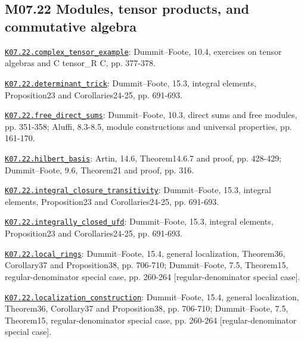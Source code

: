 \subsection*{M07.22 Modules, tensor products, and commutative algebra}
\par\smallskip\noindent\hypertarget{src:K07.22.complex_tensor_example}{}\label{src:K07.22.complex_tensor_example}\hyperref[K07.22.complex_tensor_example]{\texttt{K07.22.complex\_tensor\_example}}: Dummit--Foote, 10.4, exercises on tensor algebras and C tensor\_R C, pp. 377-378.
\par\smallskip\noindent\hypertarget{src:K07.22.determinant_trick}{}\label{src:K07.22.determinant_trick}\hyperref[K07.22.determinant_trick]{\texttt{K07.22.determinant\_trick}}: Dummit--Foote, 15.3, integral elements, Proposition23 and Corollaries24-25, pp. 691-693.
\par\smallskip\noindent\hypertarget{src:K07.22.free_direct_sums}{}\label{src:K07.22.free_direct_sums}\hyperref[K07.22.free_direct_sums]{\texttt{K07.22.free\_direct\_sums}}: Dummit--Foote, 10.3, direct sums and free modules, pp. 351-358; Aluffi, 8.3-8.5, module constructions and universal properties, pp. 161-170.
\par\smallskip\noindent\hypertarget{src:K07.22.hilbert_basis}{}\label{src:K07.22.hilbert_basis}\hyperref[K07.22.hilbert_basis]{\texttt{K07.22.hilbert\_basis}}: Artin, 14.6, Theorem14.6.7 and proof, pp. 428-429; Dummit--Foote, 9.6, Theorem21 and proof, pp. 316.
\par\smallskip\noindent\hypertarget{src:K07.22.integral_closure_transitivity}{}\label{src:K07.22.integral_closure_transitivity}\hyperref[K07.22.integral_closure_transitivity]{\texttt{K07.22.integral\_closure\_transitivity}}: Dummit--Foote, 15.3, integral elements, Proposition23 and Corollaries24-25, pp. 691-693.
\par\smallskip\noindent\hypertarget{src:K07.22.integrally_closed_ufd}{}\label{src:K07.22.integrally_closed_ufd}\hyperref[K07.22.integrally_closed_ufd]{\texttt{K07.22.integrally\_closed\_ufd}}: Dummit--Foote, 15.3, integral elements, Proposition23 and Corollaries24-25, pp. 691-693.
\par\smallskip\noindent\hypertarget{src:K07.22.local_rings}{}\label{src:K07.22.local_rings}\hyperref[K07.22.local_rings]{\texttt{K07.22.local\_rings}}: Dummit--Foote, 15.4, general localization, Theorem36, Corollary37 and Proposition38, pp. 706-710; Dummit--Foote, 7.5, Theorem15, regular-denominator special case, pp. 260-264 [regular-denominator special case].
\par\smallskip\noindent\hypertarget{src:K07.22.localization_construction}{}\label{src:K07.22.localization_construction}\hyperref[K07.22.localization_construction]{\texttt{K07.22.localization\_construction}}: Dummit--Foote, 15.4, general localization, Theorem36, Corollary37 and Proposition38, pp. 706-710; Dummit--Foote, 7.5, Theorem15, regular-denominator special case, pp. 260-264 [regular-denominator special case].
